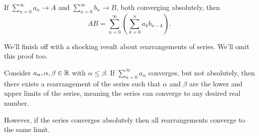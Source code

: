 \documentclass[../m131main.tex]{subfiles}
\begin{document}
\begin{theorem}[]
    If $\sum_{n=0}^{\infty} a_n \to A$ and $\sum_{n=0}^{\infty} b_n \to B$, both converging absolutely, then
    \[ AB = \sum_{n=0}^{\infty} \left( \sum_{k=0}^{n} a_k b_{n-k} \right). \]
\end{theorem}

We'll finish off with a shocking result about rearrangements of series.
We'll omit this proof too.

\begin{theorem}
    Consider $a_n, \alpha, \beta \in \mathbb{R}$ with $\alpha \leq \beta$.
    If $\sum_{n=0}^{\infty} a_n$ converges, but not absolutely, then there exists a rearrangement of the series such that $\alpha$ and $\beta$ are the lower and upper limits of the series, meaning the series can converge to any desired real number.

    However, if the series converges absolutely then all rearrangements converge to the same limit.
\end{theorem}
\end{document}

